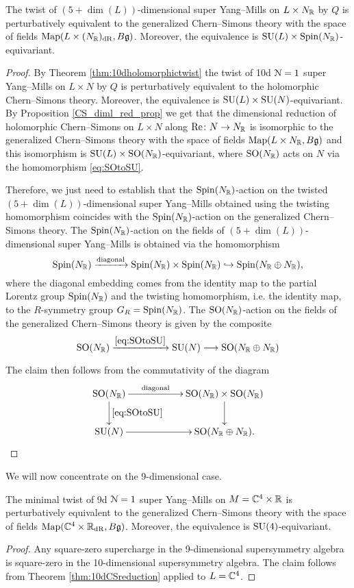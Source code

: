 \documentclass[10pt, oneside]{article}
\renewcommand{\Re}{\mathrm{Re}}
\begin{document}
\begin{theorem}
The twist of $(5+\dim(L))$-dimensional super Yang--Mills on $L\times N_\mathbb R$ by $Q$ is perturbatively equivalent to the generalized Chern--Simons theory with the space of fields $\operatorname{Map}(L\times (N_\mathbb R)_{\mathrm{dR}}, B\mathfrak g)$. Moreover, the equivalence is $\mathrm{SU}(L)\times \mathrm{Spin}(N_\mathbb R)$-equivariant.
\label{thm:10dCSreduction}
\end{theorem}
\begin{proof}
By Theorem \ref{thm:10dholomorphictwist} the twist of 10d $\mathcal N=1$ super Yang--Mills on $L\times N$ by $Q$ is perturbatively equivalent to the holomorphic Chern--Simons theory. Moreover, the equivalence is $\mathrm{SU}(L)\times \mathrm{SU}(N)$-equivariant. By Proposition \ref{CS_diml_red_prop} we get that the dimensional reduction of holomorphic Chern--Simons on $L\times N$ along $\Re\colon N\rightarrow N_\RR$ is isomorphic to the generalized Chern--Simons theory with the space of fields $\operatorname{Map}(L\times N_\mathbb R, B\mathfrak g)$ and this isomorphism is $\mathrm{SU}(L)\times \mathrm{SO}(N_\mathbb R)$-equivariant, where $\mathrm{SO}(N_\mathbb R)$ acts on $N$ via the homomorphism \eqref{eq:SOtoSU}.

Therefore, we just need to establish that the $\mathrm{Spin}(N_\mathbb R)$-action on the twisted $(5+\dim(L))$-dimensional super Yang--Mills obtained using the twisting homomorphism coincides with the $\mathrm{Spin}(N_\mathbb R)$-action on the generalized Chern--Simons theory. The $\mathrm{Spin}(N_\mathbb R)$-action on the fields of $(5+\dim(L))$-dimensional super Yang--Mills is obtained via the homomorphism
\[\mathrm{Spin}(N_\mathbb R)\xrightarrow{\mathrm{diagonal}}\mathrm{Spin}(N_\mathbb R)\times \mathrm{Spin}(N_\mathbb R)\hookrightarrow \mathrm{Spin}(N_\mathbb R\oplus N_\mathbb R),\]
where the diagonal embedding comes from the identity map to the partial Lorentz group $\mathrm{Spin}(N_\mathbb R)$ and the twisting homomorphism, i.e. the identity map, to the $R$-symmetry group $G_R=\mathrm{Spin}(N_\mathbb R)$. The $\mathrm{SO}(N_\mathbb R)$-action on the fields of the generalized Chern--Simons theory is given by the composite
\[\mathrm{SO}(N_\mathbb R)\xrightarrow{\eqref{eq:SOtoSU}} \mathrm{SU}(N)\longrightarrow \mathrm{SO}(N_\mathbb R\oplus N_\mathbb R)\]

The claim then follows from the commutativity of the diagram
\[
\xymatrix@C=2cm{
\SO(N_\RR) \ar^-{\mathrm{diagonal}}[r] \ar^{\eqref{eq:SOtoSU}}[d] & \SO(N_\RR)\times \SO(N_\RR) \ar[d] \\
\SU(N) \ar[r] & \SO(N_\RR\oplus N_\RR).
}
\]
\end{proof}

We will now concentrate on the 9-dimensional case.

\begin{theorem}
The minimal twist of 9d $\mathcal{N}=1$ super Yang--Mills on $M=\mathbb C^4\times \mathbb R$ is perturbatively equivalent to the generalized Chern--Simons theory with the space of fields $\operatorname{Map}(\mathbb C^4\times \mathbb R_{\mathrm{dR}}, B\mathfrak{g})$. Moreover, the equivalence is $\mathrm{SU}(4)$-equivariant.
\label{thm:9dminimaltwist}
\end{theorem}
\begin{proof}
Any square-zero supercharge in the 9-dimensional supersymmetry algebra is square-zero in the 10-dimensional supersymmetry algebra. The claim follows from Theorem \ref{thm:10dCSreduction} applied to $L=\mathbb C^4$.
\end{proof}
\end{document}
